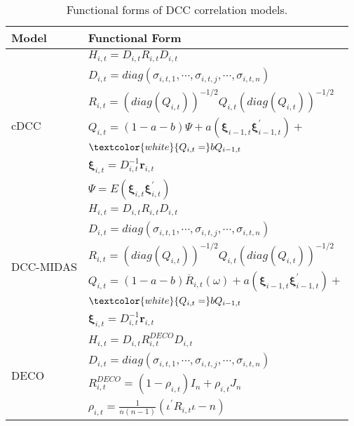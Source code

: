 \begin{table}[htbp]
    \centering
    \begin{threeparttable}
        \caption{Functional forms of DCC correlation models.\label{tab:corr_model_dynamics}}
        \begin{tabular}{l l@{\hskip .5in}}
            \toprule
            \textbf{Model} & \textbf{Functional Form} \\ 
            \midrule
            \multirow{7}{*}{cDCC \citep{Aielli:2013}} & $ H_{i,t}= D_{i,t} R_{i,t} D_{i,t} $\\
            & $D_{i,t}=diag(\sigma_{i,t,1}, \cdots, \sigma_{i,t,j}, \cdots, \sigma_{i,t,n}) $ \\
            & $R_{i,t}= (\textit{diag}(Q_{i,t}))^{-1/2} Q_{i,t} (\textit{diag}(Q_{i,t}))^{-1/2} $ \\
            & $Q_{i,t}=(1-a-b) \Psi+a(\bm{\xi}_{i-1,t}\bm{\xi}_{i-1,t}^{'})+$\\
            & $\textcolor{white}{Q_{i,t}=} b Q_{i-1,t} $\\ 
            &  $\bm{\xi}_{i,t} = D_{i,t}^{-1}\bm{r}_{i,t}$ \\ 
            & $\Psi=E\left({\bm{\xi}_{i,t}}\bm{\xi}^{'}_{i,t}\right)$  \\ \midrule
            \multirow{6}{*}{DCC-MIDAS \citep{Colacito:Engle:Ghysels:2011}} & $ H_{i,t}= D_{i,t} R_{i,t} D_{i,t} $\\
            & $D_{i,t}=diag(\sigma_{i,t,1}, \cdots, \sigma_{i,t,j}, \cdots, \sigma_{i,t,n}) $ \\
            & $R_{i,t}= (\textit{diag}(Q_{i,t}))^{-1/2} Q_{i,t} (\textit{diag}(Q_{i,t}))^{-1/2} $ \\
            & $Q_{i,t}=(1-a-b)\overline{R}_{i,t}(\omega)+a(\bm{\xi}_{i-1,t}\bm{\xi}_{i-1,t}^{'})+$\\
            & $\textcolor{white}{Q_{i,t}=} b Q_{i-1,t} $\\ 
            &  $\bm{\xi}_{i,t} = D_{i,t}^{-1}\bm{r}_{i,t}$ \\ \midrule
            \multirow{4}{*}{DECO \citep{Engle2012c}} & $ H_{i,t}= D_{i,t} R_{i,t}^{DECO} D_{i,t} $\\
            & $D_{i,t}=diag(\sigma_{i,t,1}, \cdots, \sigma_{i,t,j}, \cdots, \sigma_{i,t,n}) $ \\
            & $R_{i,t}^{DECO}= (1-\rho_{i,t})I_n+\rho_{i,t} J_n $ \\
            & $ \rho_{i,t} = \frac{1}{n(n-1)} \left(\iota^{'} R_{i,t} \iota - n\right) $\\ 

\end{tabular}
\end{threeparttable}
\end{table}

